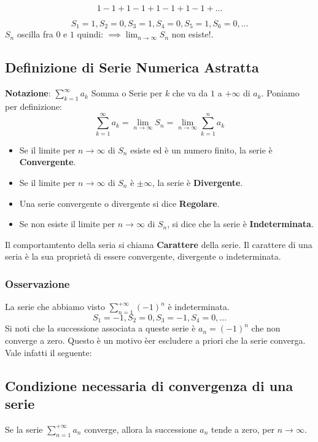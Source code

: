 \documentclass[../main.tex]{subfiles}
\begin{document}
\[
    1-1+1-1+1-1+1-1+\ldots
\]

\[
    S_1 = 1, S_2 = 0, S_3 = 1, S_4 = 0, S_5 = 1, S_6 = 0, \ldots
\]
$S_n$ oscilla fra $0$ e $1$ quindi: $\implies \lim_{n\to\infty}S_n$ non esiste!.

\subsection{Definizione di Serie Numerica Astratta}
\textbf{Notazione}: $\sum_{k=1}^\infty a_k$ Somma o Serie per $k$ che va da $1$ a
$+\infty$ di $a_k$. Poniamo per definizione:
\[
    \sum_{k=1}^\infty a_k = \lim_{n\to\infty}S_n = \lim_{n\to\infty}\sum_{k=1}^n a_k
\]

\begin{itemize}
    \item Se il limite per $n\to\infty$ di $S_n$ esiste ed è un numero finito, la serie è
          \textbf{Convergente}.
    \item Se il limite per $n\to\infty$ di $S_n$ è $\pm\infty$, la serie è
          \textbf{Divergente}.
\end{itemize}

\begin{itemize}
    \item Una serie convergente o divergente si dice \textbf{Regolare}.
    \item Se non esiste il limite per $n\to\infty$ di $S_n$, si dice che la serie è
          \textbf{Indeterminata}.
\end{itemize}
Il comportamtento della seria si chiama \textbf{Carattere} della serie. Il
carattere di una seria è la sua proprietà di essere convergente, divergente o
indeterminata.

\subsubsection{Osservazione}
La serie che abbiamo visto $\sum_{n=1}^{+\infty}(-1)^n$ è indeterminata.
\[
    S_1 = -1, S_2 = 0, S_3 = -1, S_4 = 0, \ldots
\]
Si noti che la successione associata a queste serie è $a_n=(-1)^n$ che non
converge a zero. Questo è un motivo èer escludere a priori che la serie
converga. Vale infatti il seguente:

\subsection{Condizione necessaria di convergenza di una serie}
Se la serie $\sum_{n=1}^{+\infty}a_n$ converge, allora la successione $a_n$
tende a zero, per $n\to\infty$.
\end{document}
